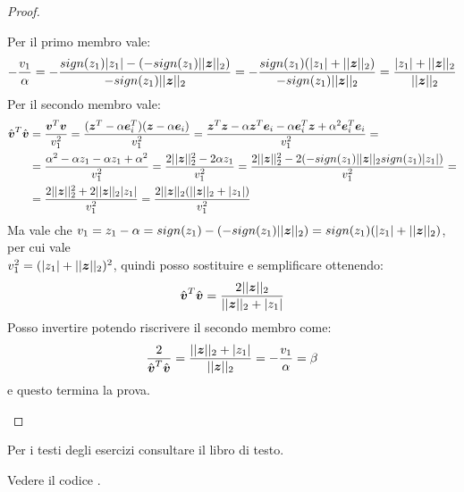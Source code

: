 \begin{proof}
\begin{itemize}
  Per il primo membro vale:
  \begin{displaymath}
  	-\frac{v_{1}}{\alpha} = 
  	- \frac{sign(z_{1})|z_{1}| -
  	(-sign(z_{1})||\boldsymbol{z}||_{2})}{-sign(z_{1})||\boldsymbol{z}||_{2}} = -
  	\frac{sign(z_{1})(|z_{1}| + ||\boldsymbol{z}||_{2})}{-sign(z_{1})||\boldsymbol{z}||_{2}}
  	= \frac{|z_{1}| + ||\boldsymbol{z}||_{2}}{||\boldsymbol{z}||_{2}}
  \end{displaymath} 
  Per il secondo membro vale:
  \begin{displaymath}
  \begin{split}   
  	\hat{\boldsymbol{v}}^{T}\hat{\boldsymbol{v}} &= \frac{\boldsymbol{v}^{T}\boldsymbol{v}}{v_{1}^{2}} =
  	\frac{(\boldsymbol{z}^{T} - \alpha \boldsymbol{e}_{i}^{T})(\boldsymbol{z} -\alpha
  	\boldsymbol{e}_{i})}{v_{1}^{2}} = 
  	\frac{\boldsymbol{z}^{T}\boldsymbol{z} -\alpha \boldsymbol{z}^{T}\boldsymbol{e}_{i} - \alpha
  	\boldsymbol{e}_{i}^{T}\boldsymbol{z}
  	+\alpha^{2}\boldsymbol{e}_{i}^{T}\boldsymbol{e}_{i}}{v_{1}^{2}} = \\
  	&= \frac{\alpha^{2} -\alpha z_{1} - \alpha
  	z_{1}+\alpha^{2}}{v_{1}^{2}} = \frac{2||\boldsymbol{z}||_{2}^{2} -2\alpha
  	z_{1}}{v_{1}^{2}} = \frac{2||\boldsymbol{z}||_{2}^{2}
  	-2(-sign(z_{1})||\boldsymbol{z}||_{2} sign(z_{1})|z_{1}|)}{v_{1}^{2}} = \\
  	&= \frac{2||\boldsymbol{z}||_{2}^{2}
  	+2||\boldsymbol{z}||_{2}|z_{1}|}{v_{1}^{2}} =
  	\frac{2||\boldsymbol{z}||_{2}(||\boldsymbol{z}||_{2} +|z_{1}|)}{v_{1}^{2}}
  \end{split}
  \end{displaymath}
  Ma vale che $v_{1} = z_{1} - \alpha = sign(z_{1}) -
  (-sign(z_{1})||\boldsymbol{z}||_{2}) = sign(z_{1})(|z_{1}| + ||\boldsymbol{z}||_{2})$, per
  cui vale \\$v_{1}^{2} = (|z_{1}| + ||\boldsymbol{z}||_{2})^{2}$, quindi posso
  sostituire e semplificare ottenendo:
  \begin{displaymath}
  	\hat{\boldsymbol{v}}^{T}\hat{\boldsymbol{v}} = \frac{2||\boldsymbol{z}||_{2}}{||\boldsymbol{z}||_{2}+|z_{1}|}
  \end{displaymath}
  Posso invertire potendo riscrivere il secondo membro come:
  \begin{displaymath}
  \frac{2}{\hat{\boldsymbol{v}}^{T}\hat{\boldsymbol{v}}} =
  \frac{||\boldsymbol{z}||_{2}+|z_{1}|}{||\boldsymbol{z}||_{2}} = -\frac{v_{1}}{\alpha} = \beta 
  \end{displaymath}
  e questo termina la prova.
\end{itemize}
\end{proof}

\begin{exercise}[3.29, 3.30]
Per i testi degli esercizi consultare il libro di testo.
\end{exercise}
Vedere il codice .

